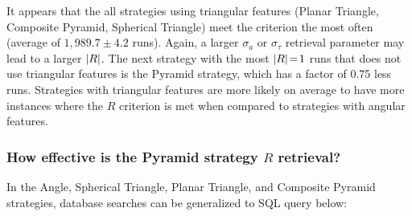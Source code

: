 It appears that the all strategies using triangular features (Planar Triangle, Composite Pyramid, Spherical Triangle)
meet the criterion the most often (average of $1{,}989.7 \pm 4.2$ runs).
Again, a larger $\sigma_a$ or $\sigma_\tau$ retrieval parameter may lead to a larger $\left| R \right|$.
The next strategy with the most $\left| R \right| \!=\! 1$ runs that does not use triangular features is the Pyramid strategy,
which has a factor of 0.75 less runs.
Strategies with triangular features are more likely on average to have more instances where the $R$ criterion is met
when compared to strategies with angular features.

\subsubsection{How effective is the Pyramid strategy $R$ retrieval?}
In the Angle, Spherical Triangle, Planar Triangle, and Composite Pyramid strategies, database searches can be
generalized to SQL query below:

